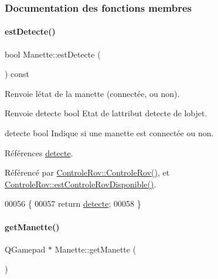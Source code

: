 \subsubsection{Documentation des fonctions membres}
\mbox{\label{class_manette_a035c0a43a11e91889891b3c874f0a58d}} 
\paragraph{\texorpdfstring{est\+Detecte()}{estDetecte()}}
{\footnotesize\ttfamily bool Manette\+::est\+Detecte (\begin{DoxyParamCaption}{ }\end{DoxyParamCaption}) const}

Renvoie l\textquotesingle{}état de la manette (connectée, ou non).

\begin{DoxyReturn}{Renvoie}
detecte bool Etat de l\textquotesingle{}attribut detecte de l\textquotesingle{}objet.

detecte bool Indique si une manette est connectée ou non. 
\end{DoxyReturn}


Références \hyperlink{class_manette_a2b9c2c380a7bce40d2c6353d534ba6a9}{detecte}.



Référencé par \hyperlink{class_controle_rov_acc4d5fea26770217df978d43df2ad51e}{Controle\+Rov\+::\+Controle\+Rov()}, et \hyperlink{class_controle_rov_a9531520e50479fc2e339cd43f4c87066}{Controle\+Rov\+::est\+Controle\+Rov\+Disponible()}.


\begin{DoxyCode}
00056 \{
00057     \textcolor{keywordflow}{return} \hyperlink{class_manette_a2b9c2c380a7bce40d2c6353d534ba6a9}{detecte};
00058 \}
\end{DoxyCode}
\mbox{\label{class_manette_a708eccb66e967e0fe575b19e9899ff5a}} 
\paragraph{\texorpdfstring{get\+Manette()}{getManette()}}
{\footnotesize\ttfamily Q\+Gamepad $\ast$ Manette\+::get\+Manette (\begin{DoxyParamCaption}{ }\end{DoxyParamCaption})}

